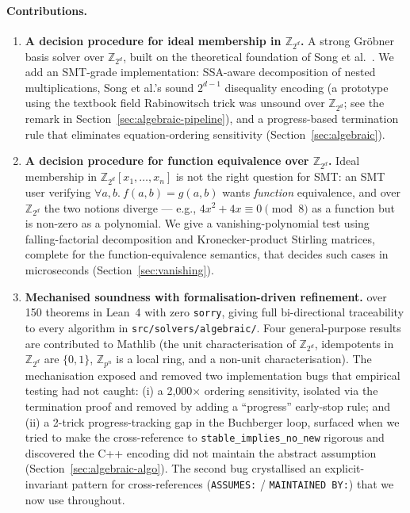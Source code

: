 \documentclass[runningheads]{llncs}
\begin{document}
\paragraph{Contributions.}
\begin{enumerate}
\item \textbf{A decision procedure for ideal membership in
  $\mathbb{Z}_{2^d}$.}
  A strong Gr\"obner basis solver over $\mathbb{Z}_{2^d}$, built
  on the theoretical foundation of
  Song et al.~\cite{song2024equational}. We add an SMT-grade
  implementation: SSA-aware decomposition of nested
  multiplications, Song et al.'s sound $2^{d-1}$ disequality
  encoding (a prototype using the textbook field Rabinowitsch
  trick was unsound over $\mathbb{Z}_{2^d}$; see the remark in
  Section~\ref{sec:algebraic-pipeline}), and
  a progress-based termination rule that eliminates
  equation-ordering sensitivity
  (Section~\ref{sec:algebraic}).

\item \textbf{A decision procedure for function equivalence over
  $\mathbb{Z}_{2^d}$.}
  Ideal membership in $\mathbb{Z}_{2^d}[x_1,\ldots,x_n]$ is not
  the right question for SMT: an SMT user verifying
  $\forall a, b.\ f(a,b) = g(a,b)$ wants \emph{function}
  equivalence, and over $\mathbb{Z}_{2^d}$ the two notions
  diverge --- e.g., $4x^2 + 4x \equiv 0 \pmod 8$ as a function
  but is non-zero as a polynomial. We give a vanishing-polynomial
  test using falling-factorial decomposition and Kronecker-product
  Stirling matrices, complete for the function-equivalence
  semantics, that decides such cases in microseconds
  (Section~\ref{sec:vanishing}).

\item \textbf{Mechanised soundness with formalisation-driven
  refinement.}
  over 150 theorems in Lean~4 with zero \texttt{sorry},
  giving full
  bi-directional traceability to every algorithm in
  \texttt{src/solvers/algebraic/}. Four general-purpose results
  are contributed to Mathlib (the unit characterisation of
  $\mathbb{Z}_{2^d}$, idempotents in $\mathbb{Z}_{2^d}$ are
  $\{0, 1\}$, $\mathbb{Z}_{p^n}$ is a local ring, and a non-unit
  characterisation). The mechanisation exposed and removed two
  implementation bugs that empirical testing had not caught:
  (i) a 2{,}000$\times$ ordering sensitivity, isolated via the
  termination proof and removed by adding a ``progress''
  early-stop rule; and (ii) a 2-trick progress-tracking gap in
  the Buchberger loop, surfaced when we tried to make the
  cross-reference to \texttt{stable\_implies\_no\_new}
  rigorous and discovered the C++ encoding did not maintain
  the abstract assumption (Section~\ref{sec:algebraic-algo}).
  The second bug crystallised an explicit-invariant pattern for
  cross-references (\texttt{ASSUMES:} / \texttt{MAINTAINED BY:})
  that we now use throughout.
\end{enumerate}
\end{document}

